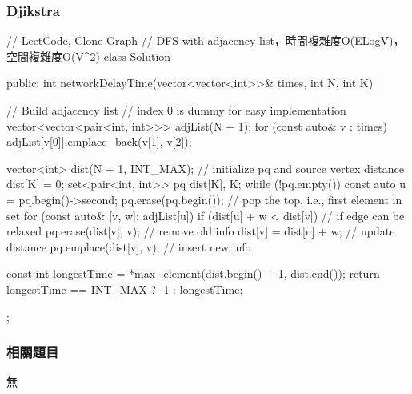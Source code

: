\subsubsection{Djikstra}
\begin{Code}
// LeetCode, Clone Graph
// DFS with adjacency list，時間複雜度O(ELogV)，空間複雜度O(V^2)
class Solution {
public:
    int networkDelayTime(vector<vector<int>>& times, int N, int K)
    {
        // Build adjacency list
        // index 0 is dummy for easy implementation
        vector<vector<pair<int, int>>> adjList(N + 1);
        for (const auto& v : times)
            adjList[v[0]].emplace_back(v[1], v[2]);

        vector<int> dist(N + 1, INT_MAX);
        // initialize pq and source vertex distance
        dist[K] = 0;
        set<pair<int, int>> pq {{dist[K], K}};
        while (!pq.empty()) {
            const auto u = pq.begin()->second;
            pq.erase(pq.begin()); // pop the top, i.e., first element in set
            for (const auto& [v, w]: adjList[u]) {
                if (dist[u] + w < dist[v]) { // if edge can be relaxed
                    pq.erase({dist[v], v}); // remove old info
                    dist[v] = dist[u] + w;  // update distance
                    pq.emplace(dist[v], v); // insert new info
                }
            }
        }

        const int longestTime = *max_element(dist.begin() + 1, dist.end());
        return longestTime == INT_MAX ? -1 : longestTime;
    }
};
\end{Code}

\subsubsection{相關題目}
\begindot
\item 無
\myenddot
